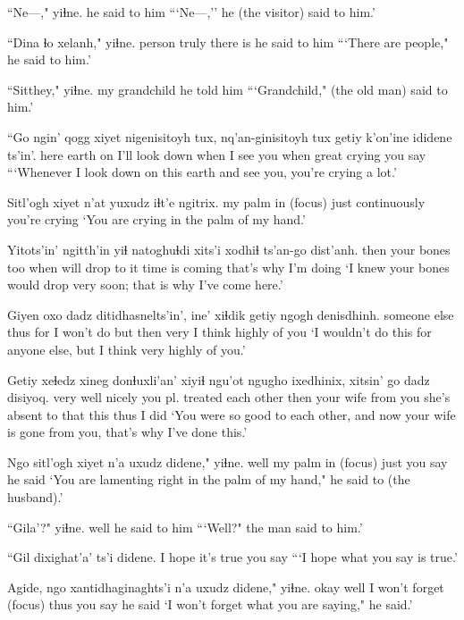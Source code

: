 \documentclass[12pt]{article}
\begin{document}
\gll ``Ne---," yiɬne.
{} {he said to him}
\glt ```Ne---,'' he (the visitor) said to him.'
\glend

\gll ``Dina ɬo xelanh," yiɬne.
person truly {there is} {he said to him}
\glt ```There are people," he said to him.'
\glend

\gll ``Sitthey," yiɬne.
{my grandchild} {he told him}
\glt ```Grandchild," (the old man) said to him.'
\glend

\gll ``Go {ngin' qogg} xiyet nigenisitoyh tux, nq'an-ginisitoyh tux getiy {k'on'ine} ididene ts'in'.
here earth on {I'll look down} when {I see you} when great crying {you say} {}
\glt ```Whenever I look down on this earth and see you, you're crying a lot.'
\glend

\gll Sitl'ogh xiyet n'at yuxudz iɬt'e ngitrix.
{my palm} in {(focus)} just continuously {you're crying}
\glt `You are crying in the palm of my hand.'
\glend

\gll Yitots'in' ngitth'in yiɬ natoghuɬdi xits'i xodhiɬ ts'an-go dist'anh.
then {your bones} too {when will drop} {to it} {time is coming} {that's why} {I'm doing}
\glt `I knew your bones would drop very soon; that is why I've come here.'
\glend

\gll Giyen oxo dadz {ditidhasnelts'in',} ine' xiɬdik getiy {ngogh denisdhinh.}
{someone else} thus for {I won't do} but then very {I think highly of you}
\glt `I wouldn't do this for anyone else, but I think very highly of you.'
\glend

\gll Getiy xeɬedz xineg donɬuxli'an' xiyiɬ ngu'ot ngugho ixedhinix, xitsin' go dadz disiyoq.
very well nicely {you pl. treated each other} then {your wife} {from you} {she's absent} {to that} this thus {I did}
\glt `You were so good to each other, and now your wife is gone from you, that's why I've done this.'
\glend

\gll Ngo sitl'ogh xiyet n'a uxudz didene," yiɬne.
well {my palm} in {(focus)} just {you say} {he said}
\glt `You are lamenting right in the palm of my hand," he said to (the husband).'
\glend

\gll ``Gila'?" yiɬne.
well {he said to him}
\glt ```Well?" the man said to him.'
\glend

\gll ``{Gil dixighat'a'} ts'i didene.
{I hope it's true} {} {you say} 
\glt ```I hope what you say is true.' 
\glend

\gll Agide, ngo xantidhaginaghts'i n'a uxudz didene," yiɬne.
okay well {I won't forget} {(focus)} thus {you say} {he said}
\glt `I won't forget what you are saying," he said.'
\glend
\end{document}
